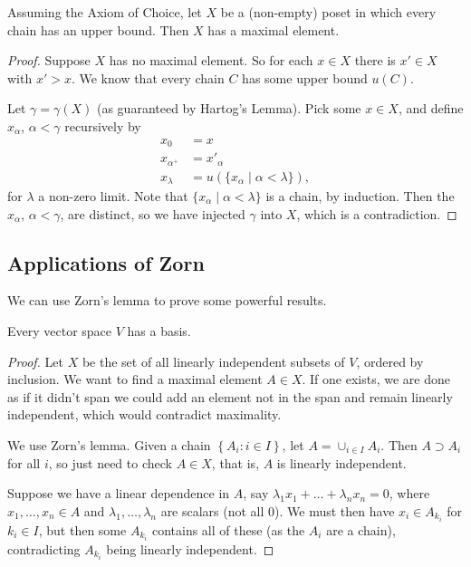 \documentclass[a4paper, 10pt, twocolumn]{amsart}
\begin{document}
\begin{theorem}
Assuming the Axiom of Choice, let $X$ be a (non-empty) poset in which every chain has an upper bound. Then $X$ has a maximal element.
\end{theorem}
\begin{proof}
  Suppose $X$ has no maximal element. So for each $x \in X$ there is $x' \in X$ with $x' > x$. We know that every chain $C$ has some upper bound $u(C)$. 

  Let $\gamma = \gamma(X)$ (as guaranteed by Hartog's Lemma). Pick some $x \in X$, and define $x_\alpha$, $\alpha < \gamma$ recursively by
  \begin{align*}
    x_0 &= x \\ x_{\alpha^+} &= x'_{\alpha} \\
    x_{\lambda} &= u(\{x_\alpha \mid \alpha < \lambda\}),
  \end{align*}
  for $\lambda$ a non-zero limit. Note that $\{x_\alpha \mid \alpha < \lambda\}$ is a chain, by induction. Then the $x_\alpha$, $\alpha < \gamma$, are distinct, so we have injected $\gamma$ into $X$, which is a contradiction.
\end{proof}

\subsection{Applications of Zorn}
We can use Zorn's lemma to prove some powerful results.

\begin{theorem}
  Every vector space $V$ has a basis.
\end{theorem}
\begin{proof}
  Let $X$ be the set of all linearly independent subsets of $V$, ordered by inclusion.
  We want to find a maximal element $A \in X$. If one exists, we are done as if it didn't span we could add an element not in the span and remain linearly independent, which would contradict maximality.

  We use Zorn's lemma. Given a chain $\left\{A_i: i \in I\right\}$, let $A=\cup_{i \in I} A_i$. Then $A \supset A_i$ for all $i$, so just need to check $A \in X$, that is, $A$ is linearly independent.

Suppose we have a linear dependence in $A$, say $\lambda_1 x_1+\ldots+\lambda_n x_n=0$, where $x_1, \ldots, x_n \in A$ and $\lambda_1, \ldots, \lambda_n$ are scalars (not all 0). 
We must then have $x_i \in A_{k_i}$ for $k_i \in I$, but then some $A_{k_i}$ contains all of these (as the $A_i$ are a chain), contradicting $A_{k_i}$ being linearly independent.
\end{proof}
\end{document}
